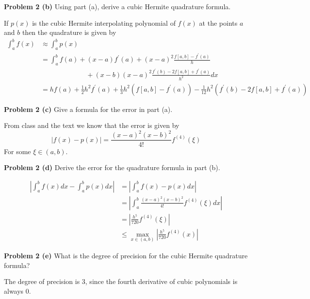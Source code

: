 \documentclass[12pt]{article}
\newcommand{\problem}[1]{\hspace{-4 ex} \large \textbf{Problem #1} }
\begin{document}
\bigbreak
\problem{2 (b)} Using part (a), derive a cubic Hermite quadrature formula. \bigbreak

	If $p(x)$ is the cubic Hermite interpolating polynomial of $f(x)$ at the points $a$ and $b$ then the quadrature is given by
	\begin{align*}
		\int_a^b f(x) & \approx \int_a^b p(x) \\
		& = \int_a^b f(a) + (x-a)f^\prime(a) + (x-a)^2 \frac{f[a,b]-f^\prime(a)}{h} \\
		& \phantom{=====} + (x-b)(x-a)^2 \frac{f^\prime(b) - 2f[a,b] + f^\prime(a)}{h^2} dx \\
		& = hf(a) + \tfrac{1}{2}h^2f^\prime(a) + \tfrac{1}{3}h^2 (f[a,b]-f^\prime(a)) - \tfrac{1}{12}h^2 (f^\prime(b) - 2f[a,b] + f^\prime(a))
	\end{align*}
	
\bigbreak
\problem{2 (c)} Give a formula for the error in part (a). \bigbreak 

	From class and the text we know that the error is given by
	$$
	\vert f(x) - p(x) \vert = \frac{(x-a)^2(x-b)^2}{4!}f^{(4)}(\xi)
	$$
	For some $\xi \in (a,b)$.
	
\bigbreak
\problem{2 (d)} Derive the error for the quadrature formula in part (b). \bigbreak

	\begin{align*}
		\left \vert \int_a^b f(x) dx - \int_a^b p(x) dx \right \vert &= \left \vert \int_a^b f(x) - p(x) dx \right \vert \\
		& = \left \vert \int_a^b \frac{(x-a)^2(x-b)^2}{4!}f^{(4)}(\xi) dx \right \vert \\
		& = \left \vert \frac{h^5}{720}f^{(4)}(\xi) \right \vert \\
		& \leq \max_{x \in (a,b)}\left \vert \frac{h^5}{720}f^{(4)}(x) \right \vert
	\end{align*}
	
\bigbreak
\problem{2 (e)} What is the degree of precision for the cubic Hermite quadrature formula? \bigbreak

	The degree of precision is 3, since the fourth derivative of cubic polynomials is always 0.
	
\end{document}
